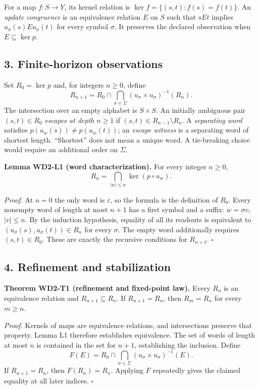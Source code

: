 \documentclass[
  11pt,
]{article}
\begin{document}
For a map \(f:S\to Y\), its kernel relation is
\(\ker f=\{(s,t):f(s)=f(t)\}\). An \emph{update congruence} is an
equivalence relation \(E\) on \(S\) such that \(sEt\) implies
\(u_\sigma(s)E u_\sigma(t)\) for every symbol \(\sigma\). It preserves
the declared observation when \(E\subseteq\ker p\).

\subsection{3. Finite-horizon
observations}\label{finite-horizon-observations}

Set \(R_0=\ker p\) and, for integers \(n\ge0\), define \[
 R_{n+1}=R_0\cap\bigcap_{\sigma\in\Sigma}
              (u_\sigma\times u_\sigma)^{-1}(R_n).
\] The intersection over an empty alphabet is \(S\times S\). An
initially ambiguous pair \((s,t)\in R_0\) \emph{escapes at depth}
\(n\ge1\) if \((s,t)\in R_{n-1}\setminus R_n\). A \emph{separating word}
satisfies \(p(u_w(s))\ne p(u_w(t))\); an \emph{escape witness} is a
separating word of shortest length. ``Shortest'' does not mean a unique
word. A tie-breaking choice would require an additional order on
\(\Sigma\).

\textbf{Lemma WD2-L1 (word characterization).} For every integer
\(n\ge0\), \[
 R_n=\bigcap_{|w|\le n}\ker(p\circ u_w).
\]

\emph{Proof.} At \(n=0\) the only word is \(\varepsilon\), so the
formula is the definition of \(R_0\). Every nonempty word of length at
most \(n+1\) has a first symbol and a suffix: \(w=\sigma v\),
\(|v|\le n\). By the induction hypothesis, equality of all its readouts
is equivalent to \((u_\sigma(s),u_\sigma(t))\in R_n\) for every
\(\sigma\). The empty word additionally requires \((s,t)\in R_0\). These
are exactly the recursive conditions for \(R_{n+1}\). \(\square\)

\subsection{4. Refinement and
stabilization}\label{refinement-and-stabilization}

\textbf{Theorem WD2-T1 (refinement and fixed-point law).} Every \(R_n\)
is an equivalence relation and \(R_{n+1}\subseteq R_n\). If
\(R_{n+1}=R_n\), then \(R_m=R_n\) for every \(m\ge n\).

\emph{Proof.} Kernels of maps are equivalence relations, and
intersections preserve that property. Lemma L1 therefore establishes
equivalence. The set of words of length at most \(n\) is contained in
the set for \(n+1\), establishing the inclusion. Define \[
 F(E)=R_0\cap\bigcap_{\sigma\in\Sigma}
                     (u_\sigma\times u_\sigma)^{-1}(E).
\] If \(R_{n+1}=R_n\), then \(F(R_n)=R_n\). Applying \(F\) repeatedly
gives the claimed equality at all later indices. \(\square\)
\end{document}
